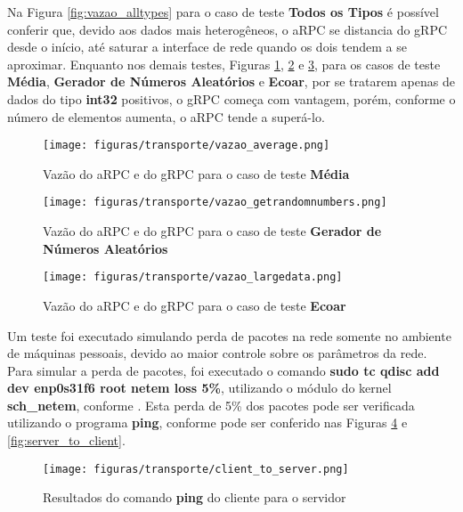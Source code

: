 Na Figura \ref{fig:vazao_alltypes} para o caso de teste \textbf{Todos os Tipos} é possível conferir que, devido aos dados mais heterogêneos, o aRPC se distancia do gRPC desde o início, até saturar a interface de rede quando os dois tendem a se aproximar. Enquanto nos demais testes, Figuras \ref{fig:vazao_average}, \ref{fig:vazao_getrandomnumbers} e \ref{fig:vazao_largedata}, para os casos de teste \textbf{Média}, \textbf{Gerador de Números Aleatórios} e \textbf{Ecoar}, por se tratarem apenas de dados do tipo \textbf{int32} positivos, o gRPC começa com vantagem, porém, conforme o número de elementos aumenta, o aRPC tende a superá-lo.

\begin{figure}[ht]
    \centering
    \caption{Vazão do aRPC e do gRPC para o caso de teste \textbf{Média}}
    \texttt{[image: figuras/transporte/vazao\_average.png]} 
    \label{fig:vazao_average}
\end{figure}

\begin{figure}[ht]
    \centering
    \caption{Vazão do aRPC e do gRPC para o caso de teste \textbf{Gerador de Números Aleatórios}}
    \texttt{[image: figuras/transporte/vazao\_getrandomnumbers.png]} 
    \label{fig:vazao_getrandomnumbers}
\end{figure}

\begin{figure}[ht!]
    \centering
    \caption{Vazão do aRPC e do gRPC para o caso de teste \textbf{Ecoar}}
    \texttt{[image: figuras/transporte/vazao\_largedata.png]} 
    \label{fig:vazao_largedata}
\end{figure}

Um teste foi executado simulando perda de pacotes na rede somente no ambiente de máquinas pessoais, devido ao maior controle sobre os parâmetros da rede. Para simular a perda de pacotes, foi executado o comando \textbf{sudo tc qdisc add dev enp0s31f6 root netem loss 5\%}, utilizando o módulo do kernel \textbf{sch\_netem}, conforme \cite{cardwell_networkingnetem_2021}. Esta perda de 5\% dos pacotes pode ser verificada utilizando o programa \textbf{ping}, conforme pode ser conferido nas Figuras \ref{fig:client_to_server} e \ref{fig:server_to_client}.

\begin{figure}[ht]
    \centering
    \caption{Resultados do comando \textbf{ping} do cliente para o servidor}
    \texttt{[image: figuras/transporte/client\_to\_server.png]} 
    \label{fig:client_to_server}
\end{figure}

